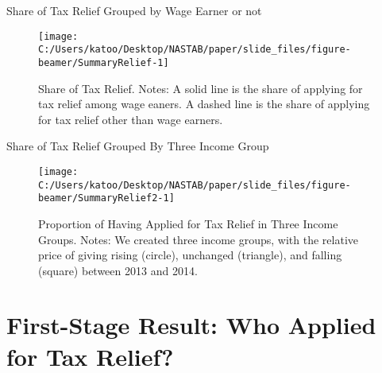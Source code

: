 \documentclass[
  ignorenonframetext,
  aspectratio=169,
]{beamer}
\begin{document}
\begin{frame}{Share of Tax Relief Grouped by Wage Earner or not}
\protect\hypertarget{share-of-tax-relief-grouped-by-wage-earner-or-not}{}
\begin{figure}[t]

{\centering \texttt{[image: C:/Users/katoo/Desktop/NASTAB/paper/slide\_files/figure-beamer/SummaryRelief-1]} 

}

\caption{Share of Tax Relief. Notes: A solid line is the share of applying for tax relief among wage eaners. A dashed line is the share of applying for tax relief other than wage earners.}\label{fig:SummaryRelief}
\end{figure}
\end{frame}

\begin{frame}{Share of Tax Relief Grouped By Three Income Group}
\protect\hypertarget{share-of-tax-relief-grouped-by-three-income-group}{}
\begin{figure}[t]

{\centering \texttt{[image: C:/Users/katoo/Desktop/NASTAB/paper/slide\_files/figure-beamer/SummaryRelief2-1]} 

}

\caption{Proportion of Having Applied for Tax Relief in Three Income Groups. Notes: We created three income groups, with the relative price of giving rising (circle), unchanged (triangle), and falling (square) between 2013 and 2014.}\label{fig:SummaryRelief2}
\end{figure}
\end{frame}

\hypertarget{first-stage-result-who-applied-for-tax-relief}{%
\section{First-Stage Result: Who Applied for Tax Relief?}\label{first-stage-result-who-applied-for-tax-relief}}
\end{document}
